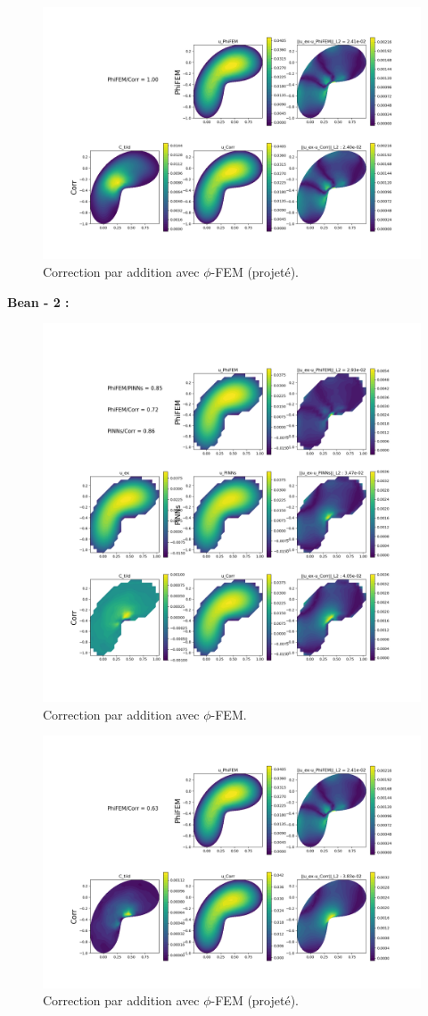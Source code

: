 \documentclass[french]{article}
\begin{document}
	\begin{figure}[H]
		\centering
		\includegraphics[width=0.6\linewidth]{"correction/bean/corr_PhiFEM_1_Omega.png"}
		\caption{Correction par addition avec $\phi$-FEM (projeté).}
	\end{figure}

	\newpage
	\textbf{Bean - 2 :}
	
	\begin{figure}[H]
		\centering
		\includegraphics[width=0.6\linewidth]{"correction/bean/corr_PhiFEM_2.png"}
		\caption{Correction par addition avec $\phi$-FEM.}
	\end{figure}
	
	\begin{figure}[H]
		\centering
		\includegraphics[width=0.6\linewidth]{"correction/bean/corr_PhiFEM_2_Omega.png"}
		\caption{Correction par addition avec $\phi$-FEM (projeté).}
	\end{figure}
\end{document}
